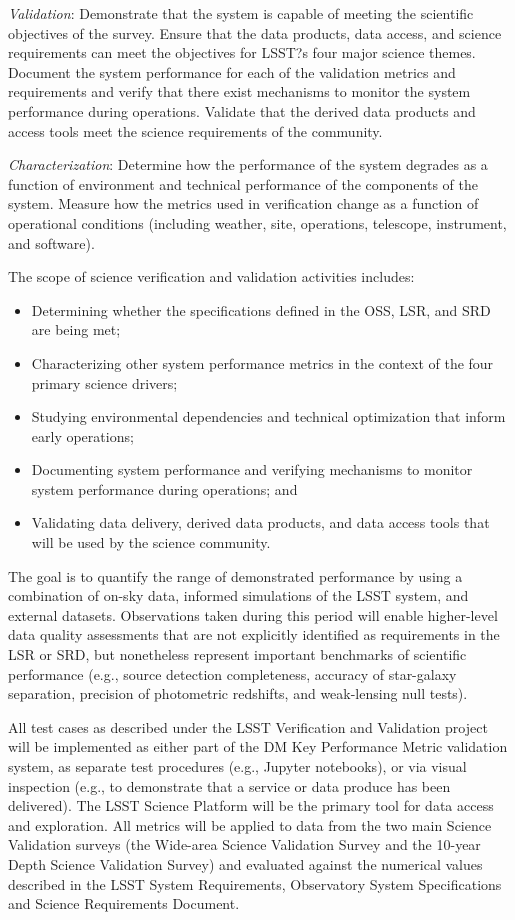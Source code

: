 \emph{Validation}: Demonstrate that the system is capable of meeting the scientific objectives of the survey. Ensure that the data products, data access, and science requirements can meet the objectives for LSST?s four major science themes. Document the system performance for each of the validation metrics and requirements and verify that there exist mechanisms to monitor the system performance during operations. Validate that the derived data products and access tools meet the science requirements of the community.

\emph{Characterization}: Determine how the performance of the system degrades as a function of environment and technical performance of the components of the system. Measure how the metrics used in verification change as a function of operational conditions (including weather, site, operations, telescope, instrument, and software).

The scope of science verification and validation activities includes:

\begin{itemize}
\item Determining whether the specifications defined in the OSS, LSR, and SRD are being met;
\item Characterizing other system performance metrics in the context of the four primary science drivers;
\item Studying environmental dependencies and technical optimization that inform early operations;
\item Documenting system performance and verifying mechanisms to monitor system performance during operations; and
\item Validating data delivery, derived data products, and data access tools that will be used by the science community.
\end{itemize}

The goal is to quantify the range of demonstrated performance by using a combination of on-sky data, informed simulations of the LSST system, and external datasets. Observations taken during this period will enable higher-level data quality assessments that are not explicitly identified as requirements in the LSR or SRD, but nonetheless represent important benchmarks of scientific performance (e.g., source detection completeness, accuracy of star-galaxy separation, precision of photometric redshifts, and weak-lensing null tests). 

All test cases as described under the LSST Verification and Validation project will be implemented as either part of the DM Key Performance Metric validation system, as separate test procedures (e.g., Jupyter notebooks), or via visual inspection (e.g., to demonstrate that a service or data produce has been delivered). The LSST Science Platform will be the primary tool for data access and exploration. All metrics will be applied to data from the two main Science Validation surveys (the Wide-area Science Validation Survey and the 10-year Depth Science Validation Survey) and evaluated against the numerical values described in the LSST System Requirements, Observatory System Specifications and Science Requirements Document.

